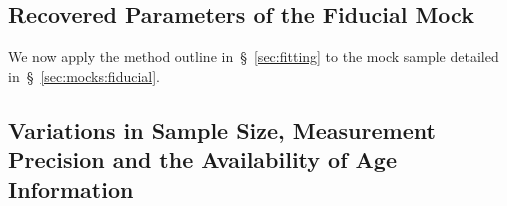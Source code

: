 \documentclass[ms.tex]{subfiles}
\begin{document}
\subsection{Recovered Parameters of the Fiducial Mock}
\label{sec:mocks:recovered}

We now apply the method outline in~\S~\ref{sec:fitting} to the mock sample
detailed in~\S~\ref{sec:mocks:fiducial}.

\subsection{Variations in Sample Size, Measurement Precision and the
Availability of Age Information}
\label{sec:mocks:variations}
\end{document}
